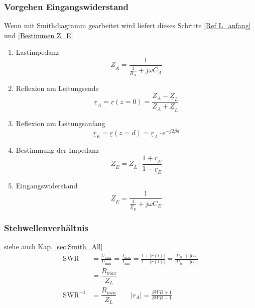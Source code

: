 \subsubsection{Vorgehen Eingangswiderstand}
Wenn mit Smithdiagramm gearbeitet wird liefert dieses Schritte \ref{Ref L_anfang} und \ref{Bestimmen Z_E}
\begin{enumerate}
    \item Lastimpedanz
          \[ \underline{Z}_A = \dfrac{1}{\frac{1}{R_A} + j \omega C_A} \]
    \item Reflexion am Leitungsende
          \[ \underline{r}_A = \underline{r}(z=0) = \dfrac{Z_A - \underline{Z}_L}{Z_A + \underline{Z}_L} \]
    \item Reflexion am Leitungsanfang \label{Ref L_anfang}
          \[ \underline{r}_E = \underline{r}(z=d) =  \underline{r}_A \cdot e^{-j 2 \beta d}\]
    \item Bestimmung der Impedanz \label{Bestimmen Z_E}
          \[ \underline{Z}_E = \underline{Z}_L \cdot \dfrac{1 + \underline{r}_E}{1 - \underline{r}_E}\]
    \item Eingangswiderstand
          \[ \underline{Z}_E = \dfrac{1}{\frac{1}{\underline{Z}_E} + j \omega C_E}\]
\end{enumerate}


\subsubsection{Stehwellenverhältnis}
siehe auch Kap. \ref{sec:Smith_All}
\begin{align*}
    \mathrm{SWR}      & = \frac{U_\text{max}}{U_\text{min}} = \frac{I_\text{max}}{I_\text{min}} = \frac{1+|r(l)|}{1-|r(l)|} = \frac{|U_h|+|U_r|}{|U_h|-|U_r|} \\
                      & = \dfrac{R_{max}}{Z_L}                                                                                                                \\
    \mathrm{SWR}^{-1} & = \dfrac{R_{min}}{Z_L} \qquad |r_A| = \frac{SWR+1}{SWR-1}
\end{align*}

